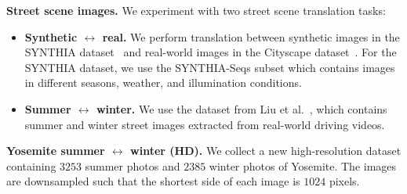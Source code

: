\documentclass[runningheads]{llncs}
\newcommand{\vpara}[1]{\vspace{0.05in}\noindent\textbf{#1}}
\begin{document}
\vpara{Street scene images.} We experiment with two street scene translation tasks: 
\begin{itemize}
		\item \textbf{Synthetic $\leftrightarrow$ real.} We perform translation between synthetic images in the SYNTHIA dataset~\cite{ros2016synthia} and real-world images in the Cityscape dataset~\cite{cordts2016cityscapes}. For the SYNTHIA dataset, we use the SYNTHIA-Seqs subset which contains images in different seasons, weather, and illumination conditions.
		\item \textbf{Summer $\leftrightarrow$ winter.} We use the dataset from Liu et al.~\cite{liu2017unsupervised}, which contains summer and winter street images extracted from real-world driving videos.
	\end{itemize}
\vpara{Yosemite summer $\leftrightarrow$ winter (HD).} We collect a new high-resolution dataset containing $3253$ summer photos and $2385$ winter photos of Yosemite. The images are downsampled such that the shortest side of each image is $1024$ pixels.
	
\end{document}
